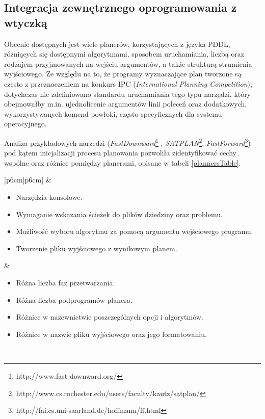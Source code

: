 \subsection{Integracja zewnętrznego oprogramowania z wtyczką}
\label{subsec:integracja}
Obecnie dostępnych jest wiele planerów, korzystających z języka PDDL, różniących się dostępnymi algorytmami, sposobem uruchamiania, liczbą oraz rodzajem przyjmowanych na wejściu argumentów, a także strukturą strumienia wyjściowego. Ze względu na to, że programy wyznaczające plan tworzone są często z przeznaczeniem na konkurs IPC (\emph{International Planning Competition}), dotychczas nie zdefiniowano standardu uruchamiania tego typu narzędzi, który obejmowałby m.in. ujednolicenie argumentów linii poleceń oraz dodatkowych, wykorzystywanych komend powłoki, często specyficznych dla systemu operacyjnego.

Analiza przykładowych narzędzi (\emph{FastDownward}\footnote{http://www.fast-downward.org/} , \emph{SATPLAN}\footnote{http://www.cs.rochester.edu/users/faculty/kautz/satplan/}, \emph{FastForward}\footnote{http://fai.cs.uni-saarland.de/hoffmann/ff.html}) pod kątem inicjalizacji procesu planowania pozwoliła zidentyfikować cechy wspólne oraz różnice pomiędzy planerami, opisane w tabeli \ref{plannersTable}.
\begin{table}[h]
\centering
\caption{Cechy wspólne oraz różnice w uruchamianiu pomiędzy przykładowymi planerami.}
\label{plannersTable}
\begin{tabular}{|p{6cm}|p{6cm}|}
\hline
{} 
    &  
   \\
   \hline
\begin{itemize}
\item Narzędzia konsolowe.
\item Wymaganie wskazania ścieżek do plików dziedziny oraz problemu.
\item Możliwość wyboru algorytmu za pomocą argumentu wejściowego programu.
\item Tworzenie pliku wyjściowego z wynikowym planem.
\end{itemize}
&
\begin{itemize}
\item Różna liczba faz przetwarzania.
\item Różna liczba podprogramów planera.
\item Różnice w nazewnictwie poszczególnych opcji i algorytmów.
\item Różnice w nazwie pliku wyjściowego oraz jego formatowaniu.
\end{itemize} \\
\hline
\end{tabular}
\end{table}

